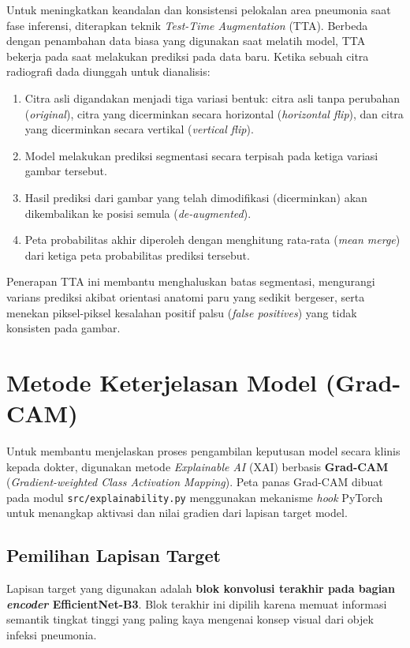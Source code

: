 \documentclass[12pt,a4paper,oneside]{book}
\begin{document}
Untuk meningkatkan keandalan dan konsistensi pelokalan area pneumonia saat fase inferensi, diterapkan teknik \textit{Test-Time Augmentation} (TTA). Berbeda dengan penambahan data biasa yang digunakan saat melatih model, TTA bekerja pada saat melakukan prediksi pada data baru. Ketika sebuah citra radiografi dada diunggah untuk dianalisis:
\begin{enumerate}
  \item Citra asli digandakan menjadi tiga variasi bentuk: citra asli tanpa perubahan (\textit{original}), citra yang dicerminkan secara horizontal (\textit{horizontal flip}), dan citra yang dicerminkan secara vertikal (\textit{vertical flip}).
  \item Model melakukan prediksi segmentasi secara terpisah pada ketiga variasi gambar tersebut.
  \item Hasil prediksi dari gambar yang telah dimodifikasi (dicerminkan) akan dikembalikan ke posisi semula (\textit{de-augmented}).
  \item Peta probabilitas akhir diperoleh dengan menghitung rata-rata (\textit{mean merge}) dari ketiga peta probabilitas prediksi tersebut.
\end{enumerate}
Penerapan TTA ini membantu menghaluskan batas segmentasi, mengurangi varians prediksi akibat orientasi anatomi paru yang sedikit bergeser, serta menekan piksel-piksel kesalahan positif palsu (\textit{false positives}) yang tidak konsisten pada gambar.

\section{Metode Keterjelasan Model (Grad-CAM)}

Untuk membantu menjelaskan proses pengambilan keputusan model secara klinis kepada dokter, digunakan metode \textit{Explainable AI} (XAI) berbasis \textbf{Grad-CAM} (\textit{Gradient-weighted Class Activation Mapping}). Peta panas Grad-CAM dibuat pada modul \texttt{src/explainability.py} menggunakan mekanisme \textit{hook} PyTorch untuk menangkap aktivasi dan nilai gradien dari lapisan target model.

\subsection{Pemilihan Lapisan Target}

Lapisan target yang digunakan adalah \textbf{blok konvolusi terakhir pada bagian \textit{encoder} EfficientNet-B3}. Blok terakhir ini dipilih karena memuat informasi semantik tingkat tinggi yang paling kaya mengenai konsep visual dari objek infeksi pneumonia.
\end{document}
